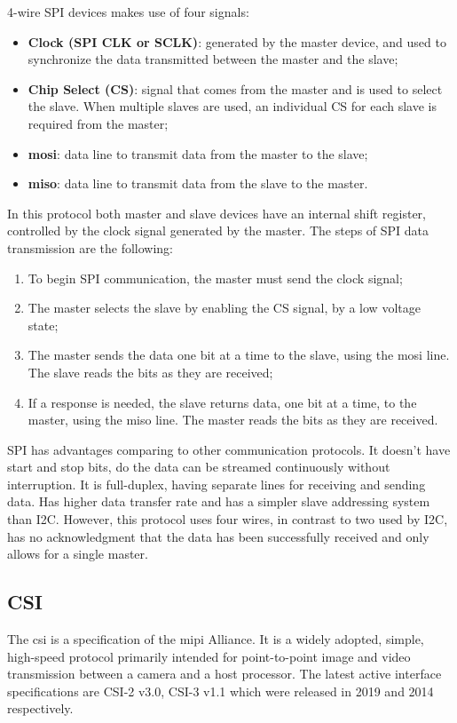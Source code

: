 4-wire SPI devices makes use of four signals:
\begin{itemize}
	\item \textbf{Clock (SPI CLK or SCLK)}: generated by the master device, and used to synchronize the data transmitted between the master and the slave;
	\item \textbf{Chip Select (CS)}: signal that comes from the master and is used to select the slave. When multiple slaves are used, an individual CS for each slave is required from the master;
	\item \textbf{\ac{mosi}}: data line to transmit data from the master to the slave;
	\item \textbf{\ac{miso}}: data line to transmit data from the slave to the master.
\end{itemize}


In this protocol both master and slave devices have an internal shift register, controlled by the clock signal generated by the master.
\clearpage
The steps of SPI data transmission are the following:

\begin{enumerate}
	\item To begin SPI communication, the master must send the clock signal;
	\item The master selects the slave by enabling the CS signal, by a low voltage state;
	\item The master sends the data one bit at a time to the slave, using the \ac{mosi} line. The slave reads the bits as they are received;
	\item If a response is needed, the slave returns data, one bit at a time, to the master, using the \ac{miso} line. The master reads the bits as they are received.
\end{enumerate}

SPI has advantages comparing to other communication protocols. It doesn't have start and stop bits, do the data can be streamed continuously without interruption. It is full-duplex, having separate lines for receiving and sending data. Has higher data transfer rate and has a simpler slave addressing system than I2C. However, this protocol uses four wires, in contrast to two used by I2C, has no acknowledgment that the data has been successfully received and only allows for a single master. \cite{spi_basics}

\clearpage
\subsection{CSI}
The \ac{csi} is a specification of the \ac{mipi} Alliance. It is a widely adopted, simple, high-speed protocol primarily intended for point-to-point image and video transmission between a camera and a host processor. The latest active interface specifications are CSI-2 v3.0, CSI-3 v1.1 which were released in 2019 and 2014 respectively. \cite{csi_basics}

